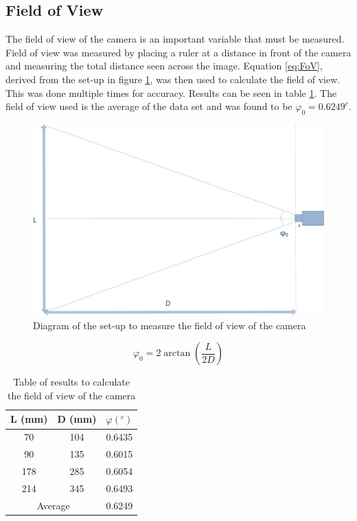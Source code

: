 \subsection{Field of View}
The field of view of the camera is an important variable that must be measured. Field of view was measured by placing a ruler at a distance in front of the camera and measuring the total distance seen across the image. Equation \eqref{eq:FoV}, derived from the set-up in figure \ref{fig:FoV}, was then used to calculate the field of view. This was done multiple times for accuracy. Results can be seen in table \ref{table:fieldofview}. The field of view used is the average of the data set and was found to be $\varphi_0 = 0.6249^c$. 
\begin{figure}
\includegraphics[width=\textwidth]{Figures/FoV.jpg}
\caption{Diagram of the set-up to measure the field of view of the camera}
\label{fig:FoV}
\end{figure}
\begin{equation}\label{eq:FoV}
\varphi_0 = 2\arctan\left(\frac{L}{2D}\right)
\end{equation}
\begin{table}
\caption{Table of results to calculate the field of view of the camera}
\label{table:fieldofview}
\centering
\begin{tabular}{ccc} \toprule
L (mm) & D (mm) & $\varphi (^c)$ \\ \toprule
70 & 104 & 0.6435\\\midrule
90 & 135 &0.6015\\\midrule
178 & 285 &0.6054\\ \midrule
214 & 345 &0.6493 \\ \bottomrule
\multicolumn{2}{|c|}{Average} & 0.6249 \\ \bottomrule
\end{tabular}

\end{table}




